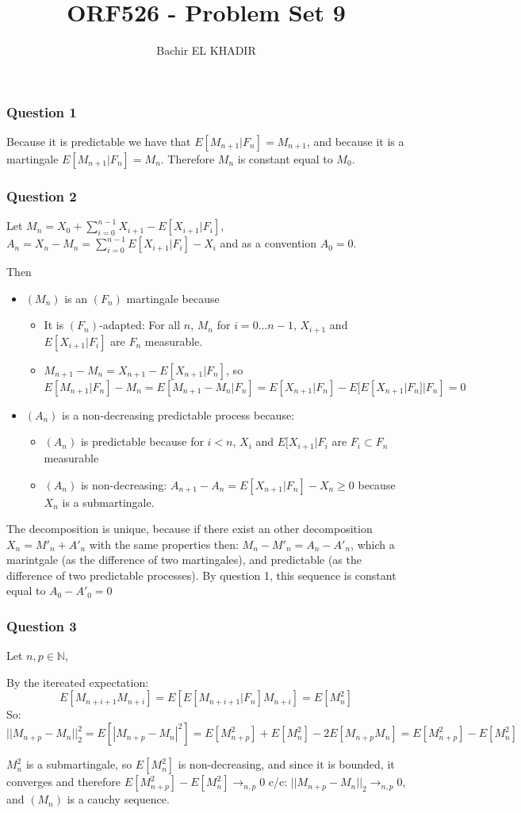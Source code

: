 \documentclass[12pt]{article}
\title{ORF526 - Problem Set 9}
\author{Bachir EL KHADIR }
\newcommand{\Q}[1]{\subsubsection*{Question #1}}
\begin{document}
\maketitle

\Q{1}
Because it is predictable we have that $E[M_{n+1}|F_n] = M_{n+1}$, and because it is a martingale $E[M_{n+1}|F_n] = M_n$. Therefore $M_n$ is constant equal to $M_0$.

\Q{2}
Let $M_n = X_0 + \sum_{i=0}^{n-1} X_{i+1} - E[X_{i+1}|F_i]$, $A_n = X_n - M_n = \sum_{i=0}^{n-1}E[X_{i+1}|F_i] - X_i$ and as a convention $A_0 = 0$.

Then

\begin{itemize}
\item $(M_n)$ is an $(F_n)$ martingale because
  \begin{itemize}
  \item It is $(F_n)$-adapted: For all $n$, $M_n$ for $i = 0... n-1$, $X_{i+1}$ and $E[X_{i+1}|F_i]$ are $F_n$ measurable.
  \item $M_{n+1} - M_n = X_{n+1} - E[X_{n+1} | F_n]$, so $$E[M_{n+1}|F_n] - M_n = E[M_{n+1} - M_n | F_n] = E[X_{n+1}|F_n] - E[E[X_{n+1} | F_n]|F_n] = 0$$
  \end{itemize}
\item $(A_n)$ is a non-decreasing predictable process because:
  \begin{itemize}
  \item $(A_n)$ is predictable because for $i < n$, $X_i$ and $E[X_{i+1}|F_i$ are $F_i \subset F_n$ measurable
  \item $(A_n)$ is non-decreasing: $A_{n+1} - A_n = E[X_{n+1}|F_n] - X_n \ge 0$ because $X_n$ is a submartingale.
  \end{itemize}
\end{itemize}
The decomposition is unique, because if there exist an other decomposition $X_n = M'_n + A'_n$ with the same properties then:
$M_n - M'_n = A_n - A'_n$, which a marintgale (as the difference of two martingales), and predictable (as the difference of two predictable processes). By question 1, this sequence is constant equal to $A_0 - A'_0 = 0$

\Q{3}
Let $n, p \in \mathbb{N}$,

By the itereated expectation: $$E[M_{n+i+1}M_{n+i}] = E[E[M_{n+i+1}|F_n]M_{n+i}] = E[M_n^2]$$
So:
$$||M_{n+p} - M_{n}||_2^2 = E[|M_{n+p} - M_n|^2] = E[M_{n+p}^2] + E[M_n^2] - 2 E[M_{n+p}M_n] = E[M_{n+p}^2] - E[M_{n}^2]$$

$M_n^2$ is a submartingale, so $E[M_n^2]$ is non-decreasing, and since it is bounded, it converges and therefore $E[M_{n+p}^2] - E[M_{n}^2] \rightarrow_{n,p} 0$
c/c: $||M_{n+p} - M_{n}||_2 \rightarrow_{n,p} 0$, and $(M_n)$ is a cauchy sequence.
\end{document}
